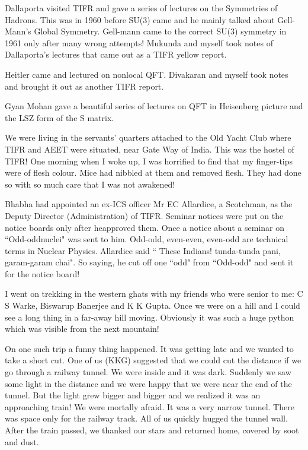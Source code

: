 Dallaporta visited TIFR and gave a series of lectures on the Symmetries 
of Hadrons. This was in 1960 before SU(3) came and he mainly talked 
about Gell-Mann's Global Symmetry. Gell-mann came to the correct SU(3) 
symmetry in 1961 only after many wrong attempts! Mukunda and myself took 
notes of Dallaporta's lectures that came out as a TIFR yellow report.

Heitler came and lectured on nonlocal QFT. Divakaran and myself took 
notes and brought it out as another TIFR report.

Gyan Mohan gave a beautiful series of lectures on QFT in Heisenberg 
picture and the LSZ form of the S matrix.

We were living in the servants' quarters attached to the Old Yacht Club 
where TIFR and AEET were situated, near Gate Way of India. This was the 
hostel of TIFR! One morning when I woke up, I was horrified to find that 
my finger-tips were of flesh colour. Mice had nibbled at them and 
removed flesh. They had done so with so much care that I was not 
awakened!

Bhabha had appointed an ex-ICS officer Mr EC Allardice, a Scotchman, 
as the Deputy Director (Administration) of TIFR. Seminar notices were 
put on the notice boards only after he\break approved them. Once a notice 
about a seminar on ``Odd-odd\break nuclei" was sent to him. Odd-odd, even-even, 
even-odd are techni\-cal terms in Nuclear Physics. Allardice said `` These 
Indians! tunda-tunda pani, garam-garam chai". So saying, he cut off one 
``odd" from ``Odd-odd" and sent it for the notice board!

I went on trekking in the western ghats with my friends who were senior 
to me: C S Warke, Biswarup Banerjee and K K Gupta. Once we were on a 
hill and I could see a long thing in a far-away hill moving. Obviously 
it was such a huge python which was visible from the next mountain!
 
On one such trip a funny thing happened. It was getting late and we 
wanted to take a short cut. One of us (KKG) suggested that we could cut 
the distance if we go through a railway tunnel. We were inside and it 
was dark. Suddenly we saw some light in the distance and we were happy 
that we were near the end of the tunnel. But the light grew bigger and 
bigger and we realized it was an approaching train! We were mortally 
afraid. It was a very narrow tunnel. There was space only for the 
railway track. All of us quickly hugged the tunnel wall. After the train 
passed, we thanked our stars and returned home, covered by soot and 
dust.

